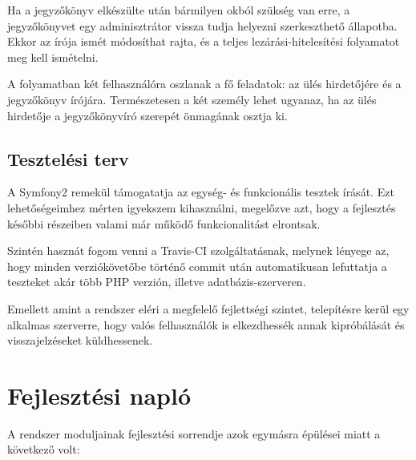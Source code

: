 \documentclass[a4paper,12pt,oneside]{report}
\begin{document}
Ha a jegyzőkönyv elkészülte után bármilyen okból szükség van erre, a jegyzőkönyvet egy adminisztrátor vissza tudja helyezni szerkeszthető állapotba. Ekkor az írója ismét módosíthat rajta, és a teljes lezárási-hitelesítési folyamatot meg kell ismételni.

A folyamatban két felhasználóra oszlanak a fő feladatok: az ülés hirdetőjére és a jegyzőkönyv írójára. Természetesen a két személy lehet ugyanaz, ha az ülés hirdetője a jegyzőkönyvíró szerepét önmagának osztja ki.

\subsection{Tesztelési terv}

A Symfony2 remekül támogatatja az egység- és funkcionális tesztek írását. Ezt lehetőségeimhez mérten igyekszem kihasználni, megelőzve azt, hogy a fejlesztés későbbi részeiben valami már működő funkcionalitást elrontsak.

Szintén hasznát fogom venni a Travis-CI szolgáltatásnak, melynek lényege az, hogy minden verziókövetőbe történő commit után automatikusan lefuttatja a teszteket akár több PHP verzión, illetve adatbázis-szerveren.

Emellett amint a rendszer eléri a megfelelő fejlettségi szintet, telepítésre kerül egy alkalmas szerverre, hogy valós felhasználók is elkezdhessék annak kipróbálását és visszajelzéseket küldhessenek.

\section{Fejlesztési napló}

A rendszer moduljainak fejlesztési sorrendje azok egymásra épülései miatt a következő volt:
\end{document}
